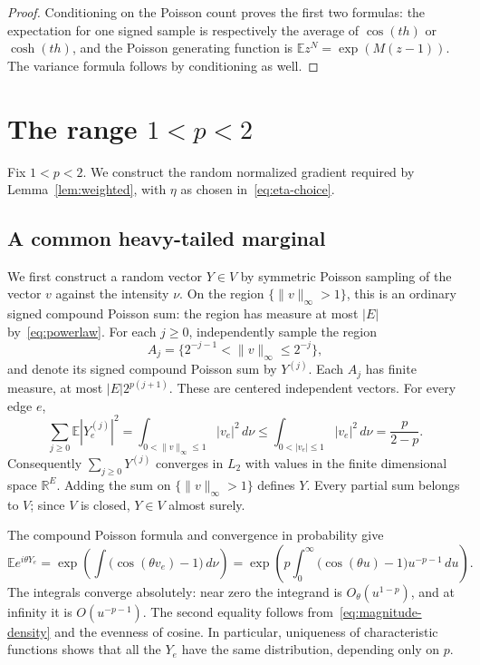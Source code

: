 \documentclass[11pt]{article}
\newcommand{\R}{\mathbb R}
\newcommand{\E}{\mathbb E}
\theoremstyle{remark}
\numberwithin{equation}{section}
\begin{document}
\begin{proof}
Conditioning on the Poisson count proves the first two formulas:
the expectation for one signed sample is respectively the average
of $\cos(th)$ or $\cosh(th)$, and the Poisson generating function is
$\E z^N=\exp(M(z-1))$. The variance formula follows by conditioning
as well.
\end{proof}

\section{The range \texorpdfstring{$1<p<2$}{1 < p < 2}}\label{sec:below}

Fix $1<p<2$. We construct the random normalized gradient required by
Lemma~\ref{lem:weighted}, with $\eta$ as chosen in~\eqref{eq:eta-choice}.

\subsection{A common heavy-tailed marginal}

We first construct a random vector $Y\in V$ by symmetric Poisson sampling
of the vector $v$ against the intensity $\nu$. On the region
$\{\|v\|_\infty>1\}$, this is an ordinary signed compound Poisson sum:
the region has measure at most $|E|$ by~\eqref{eq:powerlaw}. For each
$j\ge0$, independently sample the region
\[
 A_j=\{2^{-j-1}<\|v\|_\infty\le2^{-j}\},
\]
and denote its signed compound Poisson sum by $Y^{(j)}$.
Each $A_j$ has finite measure, at most $|E|2^{p(j+1)}$.
These are centered independent vectors. For every edge $e$,
\[
 \sum_{j\ge0}\E|Y^{(j)}_e|^2
 =\int_{0<\|v\|_\infty\le1}|v_e|^2\,d\nu
 \le\int_{0<|v_e|\le1}|v_e|^2\,d\nu
 =\frac{p}{2-p}.
\]
Consequently $\sum_{j\ge0}Y^{(j)}$ converges in $L_2$ with values in the
finite dimensional space $\R^E$. Adding the sum on
$\{\|v\|_\infty>1\}$ defines $Y$. Every partial sum belongs to $V$;
since $V$ is closed, $Y\in V$ almost surely.

The compound Poisson formula and convergence in probability give
\begin{equation}\label{eq:below-characteristic}
 \E e^{i\theta Y_e}
 =\exp\left(\int\bigl(\cos(\theta v_e)-1\bigr)\,d\nu\right)
 =\exp\left(p\int_0^\infty
       \bigl(\cos(\theta u)-1\bigr)u^{-p-1}\,du\right).
\end{equation}
The integrals converge absolutely: near zero the integrand is
$O_\theta(u^{1-p})$, and at infinity it is $O(u^{-p-1})$.
The second equality follows from~\eqref{eq:magnitude-density} and the evenness
of cosine. In particular, uniqueness of characteristic functions
\cite[Theorem~3.3.11]{Durrett2019} shows that all the $Y_e$ have the
same distribution, depending only on $p$.
\end{document}
